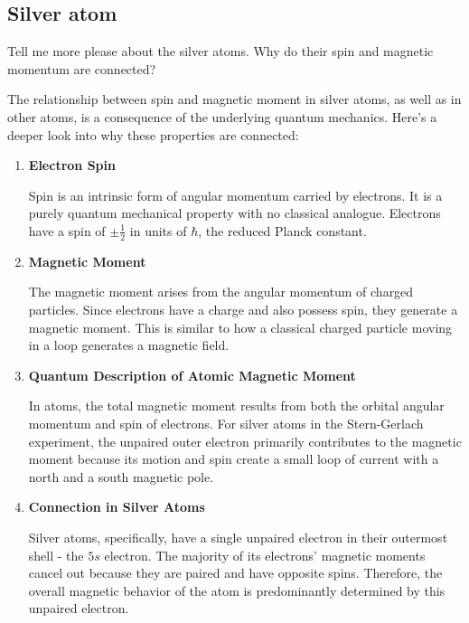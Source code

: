 \subsection{Silver atom}


\begin{ai}
Tell me more please about the silver atoms. Why do their spin and magnetic momentum are connected?
\end{ai}

\begin{airesult}
The relationship between spin and magnetic moment in silver atoms, as well as in other atoms, is a
consequence of the underlying quantum mechanics. Here's a deeper look into why these properties are
connected:

\vsp

\begin{enumerate}
\item \textbf{Electron Spin}

Spin is an intrinsic form of angular momentum carried by electrons. It is a purely quantum
mechanical property with no classical analogue. Electrons have a spin of \(\pm \frac{1}{2}\) in
units of \(\hbar\), the reduced Planck constant.

\item \textbf{Magnetic Moment}

The magnetic moment arises from the angular momentum of charged particles. Since electrons have a
charge and also possess spin, they generate a magnetic moment. This is similar to how a classical
charged particle moving in a loop generates a magnetic field.

\item \textbf{Quantum Description of Atomic Magnetic Moment}

In atoms, the total magnetic moment results from both the orbital angular momentum and spin of
electrons. For silver atoms in the Stern-Gerlach experiment, the unpaired outer electron primarily
contributes to the magnetic moment because its motion and spin create a small loop of current with a
north and a south magnetic pole.

\item \textbf{Connection in Silver Atoms}

Silver atoms, specifically, have a single unpaired electron in their outermost shell - the \(5s\)
electron. The majority of its electrons' magnetic moments cancel out because they are paired and
have opposite spins. Therefore, the overall magnetic behavior of the atom is predominantly
determined by this unpaired electron.


\end{enumerate}
\end{airesult}
